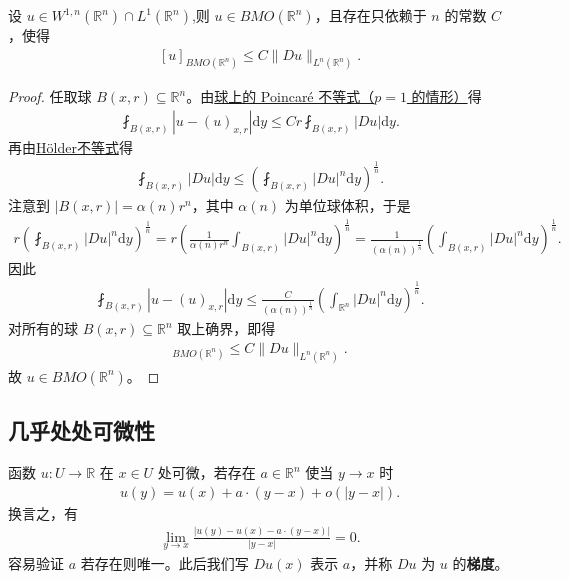 \documentclass[../../main.tex]{subfiles}
\begin{document}
\begin{theorem}\label{theorem:W1n嵌入BMO}
设 $u\in W^{1,n}(\mathbb{R}^n)\cap L^1(\mathbb{R}^n)$,则 $u\in BMO(\mathbb{R}^n)$，且存在只依赖于 $n$ 的常数 $C$，使得
\begin{align}\label{eq:BMO估计}
[u]_{BMO(\mathbb{R}^n)} \leqslant C \|Du\|_{L^n(\mathbb{R}^n)}.
\end{align}
\end{theorem}
\begin{proof}
任取球 $B(x,r)\subseteq \mathbb{R}^n$。由\hyperref[theorem:ch05-球Poincare]{球上的 Poincaré 不等式（$p=1$ 的情形）}得
\begin{align*}
\fint_{B(x,r)} |u - (u)_{x,r}| \mathrm{d}y \leqslant C r \fint_{B(x,r)} |Du| \mathrm{d}y.
\end{align*}
再由\hyperref[Real Analysis-theorem:实变函数--Hölder不等式]{Hölder不等式}得
\begin{align*}
\fint_{B(x,r)} |Du| \mathrm{d}y \leqslant \left( \fint_{B(x,r)} |Du|^n \mathrm{d}y \right)^{\frac{1}{n}}.
\end{align*}
注意到 $|B(x,r)| = \alpha(n) r^n$，其中 $\alpha(n)$ 为单位球体积，于是
\begin{align*}
r \left( \fint_{B(x,r)} |Du|^n \mathrm{d}y \right)^{\frac{1}{n}}
= r \left( \frac{1}{\alpha(n) r^n} \int_{B(x,r)} |Du|^n \mathrm{d}y \right)^{\frac{1}{n}}
= \frac{1}{(\alpha(n))^{\frac{1}{n}}} \left( \int_{B(x,r)} |Du|^n \mathrm{d}y \right)^{\frac{1}{n}}.
\end{align*}
因此
\begin{align*}
\fint_{B(x,r)} |u - (u)_{x,r}| \mathrm{d}y \leqslant \frac{C}{(\alpha(n))^{\frac{1}{n}}} \left( \int_{\mathbb{R}^n} |Du|^n \mathrm{d}y \right)^{\frac{1}{n}}.
\end{align*}
对所有的球 $B(x,r)\subseteq \mathbb{R}^n$ 取上确界，即得
\begin{align*}
[u]_{BMO(\mathbb{R}^n)} \leqslant C \|Du\|_{L^n(\mathbb{R}^n)}.
\end{align*}
故 $u\in BMO(\mathbb{R}^n)$。
\end{proof}



\subsection{几乎处处可微性}\label{subsection:ch05-a.e.可微}

\begin{definition}\label{definition:ch05-可微}
函数 $u:U\to\mathbb{R}$ 在 $x\in U$ 处可微，若存在 $a\in\mathbb{R}^{n}$ 使当 $y\to x$ 时
\begin{align}
u(y)=u(x)+a\cdot(y-x)+o(|y-x|).
\end{align}
换言之，有
\begin{align*}
\lim_{y\to x}\frac{|u(y)-u(x)-a\cdot(y-x)|}{|y-x|}=0.
\end{align*}
容易验证 $a$ 若存在则唯一。此后我们写 $Du(x)$ 表示 $a$，并称 $Du$ 为 $u$ 的\textbf{梯度}。
\end{definition}
\end{document}
